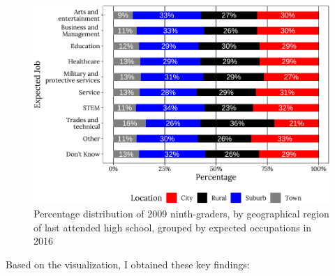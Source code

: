 \documentclass[11pt,]{article}
\begin{document}
\begin{figure}
\centering
\includegraphics{Nathan-Nguyen-NISS-data-analysis_files/figure-latex/visualization-1.pdf}
\caption{\label{fig:figs}Percentage distribution of 2009 ninth-graders,
by geographical region of last attended high school, grouped by expected
occupations in 2016}
\end{figure}

Based on the visualization, I obtained these key findings:
\end{document}
